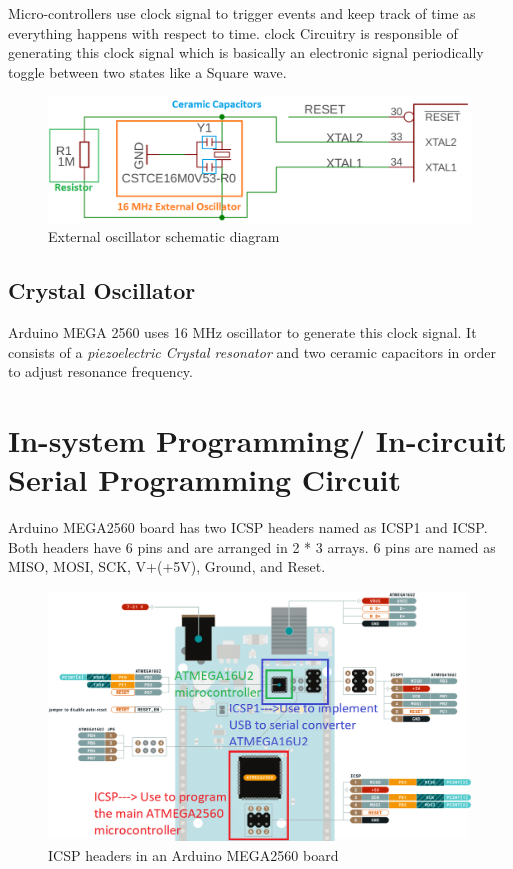\documentclass[a4paper,11pt,twocolumn]{article}
\begin{document}
Micro-controllers use clock signal to trigger events and keep track of time as everything happens with respect to time. clock Circuitry is responsible of  generating this clock signal which is basically an electronic signal periodically toggle between two states like a Square wave\cite{osci}. 

\begin{center}
	\begin{figure}[!h]
		\centering
		\includegraphics[scale=0.3]{figures/clock}
		\caption{External oscillator schematic diagram\cite{arduino}}
	\end{figure}
\end{center}

\subsection{Crystal Oscillator}

Arduino MEGA 2560 uses 16 MHz oscillator to generate this clock signal. It consists of a \textit{piezoelectric Crystal resonator}\cite{crystal} and two ceramic capacitors in order to adjust resonance frequency. 

 
\section{In-system Programming/ In-circuit Serial Programming Circuit}

Arduino MEGA2560 board has two ICSP headers named as ICSP1 and ICSP. Both headers have 6 pins and are arranged in 2 * 3 arrays. 6 pins are named as MISO, MOSI, SCK, V+(+5V), Ground, and Reset\cite{icsp}.

\begin{center}
	\begin{figure}[!h]
		\centering
		\includegraphics[scale=0.35]{figures/programmer}
		\caption{ICSP headers in an Arduino MEGA2560 board\cite{arduino}}
	\end{figure}
\end{center}
\end{document}
